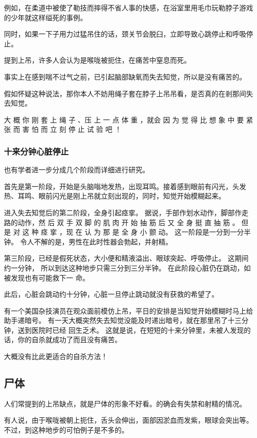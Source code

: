 \documentclass[UTF8]{ctexart}
\begin{document}
例如，在柔道中被使了勒技而摔得不省人事的快感，在浴室里用毛巾玩勒脖子游戏的少年就这样缢死的事例。

同时，如果一下子用力过猛吊住的话，颈关节会脱臼，立即导致心跳停止和呼吸停止。

提到上吊，许多人会认为是喉咙被扼住，在痛苦中窒息而死。

事实上在感到喘不过气之前，已引起脑部缺氧而失去知觉，所以是没有痛苦的。

假如怀疑这种说法，那你本人不妨用绳子套在脖子上吊吊看，是否真的在剎那间失去知觉。

大 概 你 刚 套 上 绳 子 、压 上 一 点 体 重 ，就会 因 为 觉 得 比 想 象 中 要 紧 张 而 害 怕 而 立 刻 停 止 试 验 吧 ！ 

\subsubsection*{十来分钟心脏停止}

也有学者进一步分成几个阶段而详细进行研究。

首先是第一阶段，开始是头脑嗡地发热，出现耳鸣。接着感到眼前有闪光，头发热、耳鸣、眼前闪光是刚上吊就立刻出现的，同时，知觉开始模糊起来。

进入失去知觉后的第二阶段，全身引起痉挛。
据说，手部作划水动作，脚部作走路的动作，然 后 双 手 双 脚 的 肌 肉 开 始 抽 筋 后 又 全 身 挺 直 抽 筋 。
但是 对 这 种 痉 挛 ，现 在 认 为 那 是 全 身 小 颤 动。
这一阶段是一分到一分半钟。
令人不解的是，男性在此时性器会勃起，并射精。

 第三阶段，已经是假死状态，大小便和精液溢出、眼球突起、呼吸停止。
这期间约一分钟， 所以到达这种地步只需三分到三分半钟。
在此阶段心脏仍在跳动，如被发现也有可能救下一 命。

此后，心脏会跳动约十分钟，心脏一旦停止跳动就没有获救的希望了。

有一个美国杂技演员在观众面前模仿上吊，平日的安排是当知觉开始模糊时马上给助手递暗号。
有一天大概突然失去知觉没能及时递出暗号，就在那里吊了十三分钟，送到医院时已经 回生乏术。
这就是说，在短短的十来分钟里，未被人发现的话，你的自杀就成功了而且没有痛苦。

大概没有比此更适合的自杀方法！

\subsection{尸体}
 
人们常提到的上吊缺点，就是尸体的形象不好看。的确会有失禁和射精的情况。

有人说，由于喉咙被朝上扼住，舌头会伸出，面部因淤血而发紫，眼球会突出等。不过，到这种地步的可怕例子是不多的。
\end{document}
